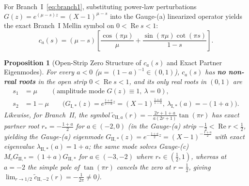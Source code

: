 \documentclass[11pt,a4paper]{article}
\newtheorem{prop}{Proposition}[section]
\begin{document}
For Branch~I~\eqref{eq:branch1}, substituting power-law perturbations $G(z) = e^{(\mu - s)z} = (X-1)^{\mu - s}$ into the Gauge-(a) linearized operator yields the exact Branch~I Mellin symbol on $0 < \operatorname{Re} s < 1$:
\begin{equation}\label{eq:ca_symbol}
c_a(s) = (\mu - s)\!\left[\frac{\cos(\pi\mu)}{\mu} + \frac{\sin(\pi\mu)\cot(\pi s)}{1 - s}\right].
\end{equation}
\begin{prop}[Open-Strip Zero Structure of $c_a(s)$ and Exact Partner Eigenmodes]\label{prop:zeros}
For every $a < 0$ ($\mu = (1-a)^{-1} \in (0,1)$), $c_a(s)$ has \textbf{no non-real roots} in the open strip $0 < \operatorname{Re} s < 1$, and its only real roots in $(0,1)$ are
\begin{align*}
s_1 &= \mu \qquad (\text{amplitude mode } G(z) \equiv 1,\ \lambda = 0), \\
s_2 &= 1 - \mu \qquad \big(G_{\mathrm{I},*}(z) = e^{\frac{1+a}{1-a}z} = (X-1)^{\frac{1+a}{1-a}},\ \lambda_{\mathrm{I},*}(a) = -(1+a)\big).
\end{align*}
Likewise, for Branch~II, the symbol $\tilde c_{\mathrm{II},a}(r) = -\frac{2r+1+a}{a(2r+1)}\tan(\pi r)$ has exact partner root $r_* = -\frac{1+a}{2}$ for $a \in (-2, 0)$ (in the Gauge-(a) strip $-\frac{1}{2} < \operatorname{Re} r < \frac{1}{2}$, yielding the Gauge-(a) eigenmode $G_{\mathrm{II},*}(z) = e^{-\frac{1+a}{2}z} = (X-1)^{-\frac{1+a}{2}}$ with exact eigenvalue $\lambda_{\mathrm{II},*}(a) = 1 + a$; the same mode solves Gauge-(c) $M_c G_{\mathrm{II},*} = (1+a)G_{\mathrm{II},*}$ for $a \in (-3, -2)$ where $r_* \in (\frac{1}{2}, 1)$, whereas at $a = -2$ the simple pole of $\tan(\pi r)$ cancels the zero at $r = \frac{1}{2}$, giving $\lim_{r\to 1/2}\tilde c_{\mathrm{II},-2}(r) = -\frac{1}{2\pi} \ne 0$).
\end{prop}
\end{document}
